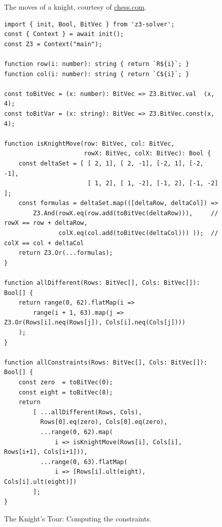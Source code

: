 \begin{figure}[!ht]
  \centering
  \caption{The moves of a knight, courtesy of \href{https://www.chess.com/}{chess.com}.}
  \label{fig:knight-moves.png}
\end{figure}

\begin{figure}[!ht]
\centering
\begin{verbatim}
import { init, Bool, BitVec } from 'z3-solver';
const { Context } = await init();
const Z3 = Context("main");
                 
function row(i: number): string { return `R${i}`; }
function col(i: number): string { return `C${i}`; }

const toBitVec = (x: number): BitVec => Z3.BitVec.val  (x, 4);
const toBitVar = (x: string): BitVec => Z3.BitVec.const(x, 4);

function isKnightMove(row: BitVec, col: BitVec,
                      rowX: BitVec, colX: BitVec): Bool {
    const deltaSet = [ [ 2, 1], [ 2, -1], [-2, 1], [-2, -1],
                       [ 1, 2], [ 1, -2], [-1, 2], [-1, -2] ];
    const formulas = deltaSet.map(([deltaRow, deltaCol]) =>                         
        Z3.And(rowX.eq(row.add(toBitVec(deltaRow))),     // rowX == row + deltaRow,
               colX.eq(col.add(toBitVec(deltaCol))) ));  // colX == col + deltaCol 
    return Z3.Or(...formulas);
}

function allDifferent(Rows: BitVec[], Cols: BitVec[]): Bool[] {
    return range(0, 62).flatMap(i => 
        range(i + 1, 63).map(j => Z3.Or(Rows[i].neq(Rows[j]), Cols[i].neq(Cols[j])))
    );
}

function allConstraints(Rows: BitVec[], Cols: BitVec[]): Bool[] {
    const zero  = toBitVec(0);
    const eight = toBitVec(8);
    return
        [ ...allDifferent(Rows, Cols), 
          Rows[0].eq(zero), Cols[0].eq(zero),
          ...range(0, 62).map(
              i => isKnightMove(Rows[i], Cols[i], Rows[i+1], Cols[i+1])),
          ...range(0, 63).flatMap(
              i => [Rows[i].ult(eight), Cols[i].ult(eight)])
        ];
}   
\end{verbatim}
\vspace*{-0.3cm}
\caption{The Knight's Tour: Computing the constraints.}
\label{fig:Knight's Tour with Z3.ipynb-1}
\end{figure}



